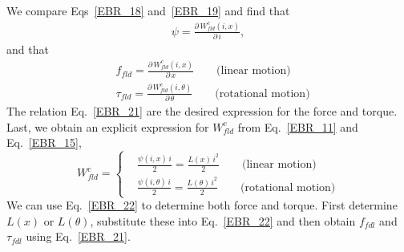\documentclass[11pt,a4paper,oneside]{book}
\numberwithin{equation}{section}
\theoremstyle{it}
\theoremstyle{definition}
\begin{document}
We compare Eqs~\ref{EBR_18} and~\ref{EBR_19} and find that
\begin{equation}\label{EBR_20}
	\begin{aligned}
		\psi = \frac{\partial\,W_{fld}^c(i,x)}{\partial\,i},
	\end{aligned}
\end{equation} 
and that 
\begin{equation}\label{EBR_21}
	\boxed{	\begin{aligned}
		&f_{fld} = \frac{\partial\,W_{fld}^c(i,x)}{\partial\,x} \qquad \text{(linear motion)} \\[8pt]
		&\tau_{fld} = \frac{\partial\,W_{fld}^c(i,\theta)}{\partial\,\theta} \qquad \text{(rotational motion)}
	\end{aligned} }
\end{equation} 
The relation Eq.~\eqref{EBR_21} are the desired expression for the force and torque. Last, we obtain an explicit expression for $W_{fld}^c$ from Eq.~\eqref{EBR_11} and Eq.~\eqref{EBR_15},
\begin{equation}\label{EBR_22}
	\boxed{	
		W_{fld}^c=\left\{
		\begin{aligned}
			&\frac{\psi(i,x)\,i}{2}=\frac{L(x)\,i^2}{2} \qquad \text{(linear motion)} \\[8pt]
			&\frac{\psi(i,\theta)\,i}{2}=\frac{L(\theta)\,i^2}{2} \qquad \text{(rotational motion)}
		\end{aligned} \right.
	}
\end{equation} 
We can use Eq.~\eqref{EBR_22} to determine both force and torque. First determine $L(x)$ or $L(\theta)$, substitute these into Eq.~\eqref{EBR_22} and then obtain $f_{fdl}$ and $\tau_{fdl}$ using Eq.~\eqref{EBR_21}.
\end{document}
